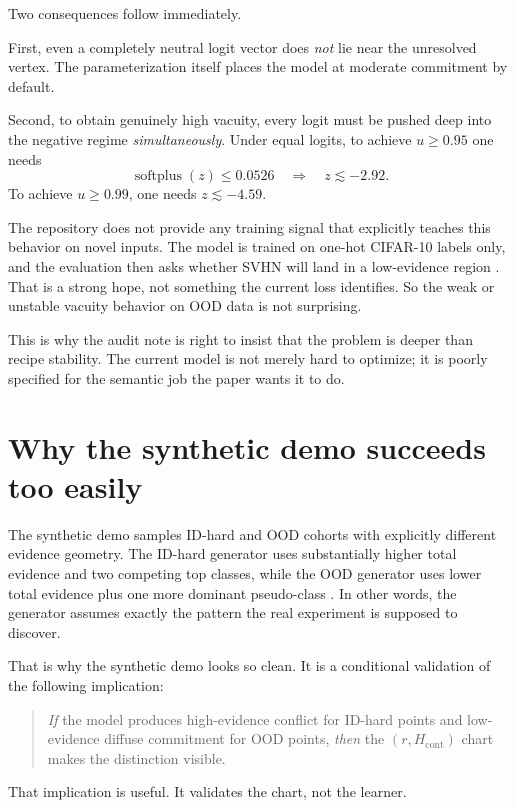 \documentclass[11pt]{article}
\begin{document}
Two consequences follow immediately.

First, even a completely neutral logit vector does \emph{not} lie near the unresolved vertex. The parameterization itself places the model at moderate commitment by default.

Second, to obtain genuinely high vacuity, every logit must be pushed deep into the negative regime \emph{simultaneously}. Under equal logits, to achieve $u\ge 0.95$ one needs
\[
\operatorname{softplus}(z)\le 0.0526
\quad\Longrightarrow\quad
z \lesssim -2.92.
\]
To achieve $u\ge 0.99$, one needs $z\lesssim -4.59$.

The repository does not provide any training signal that explicitly teaches this behavior on novel inputs. The model is trained on one-hot CIFAR-10 labels only, and the evaluation then asks whether SVHN will land in a low-evidence region \cite{train,eval}. That is a strong hope, not something the current loss identifies. So the weak or unstable vacuity behavior on OOD data is not surprising.

This is why the audit note is right to insist that the problem is deeper than recipe stability. The current model is not merely hard to optimize; it is poorly specified for the semantic job the paper wants it to do.

\section{Why the synthetic demo succeeds too easily}

The synthetic demo samples ID-hard and OOD cohorts with explicitly different evidence geometry. The ID-hard generator uses substantially higher total evidence and two competing top classes, while the OOD generator uses lower total evidence plus one more dominant pseudo-class \cite{synthetic}. In other words, the generator assumes exactly the pattern the real experiment is supposed to discover.

That is why the synthetic demo looks so clean. It is a conditional validation of the following implication:

\begin{quote}
\emph{If} the model produces high-evidence conflict for ID-hard points and low-evidence diffuse commitment for OOD points, \emph{then} the $(r,H_{\mathrm{cont}})$ chart makes the distinction visible.
\end{quote}

That implication is useful. It validates the chart, not the learner.
\end{document}
